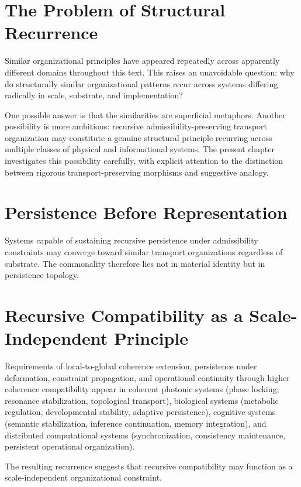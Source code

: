 \documentclass[11pt,openany]{book}
\theoremstyle{definition}
\theoremstyle{plain}
\begin{document}
\bigskip

\section{The Problem of Structural Recurrence}

Similar organizational principles have appeared repeatedly across apparently different domains throughout this text. This raises an unavoidable question: why do structurally similar organizational patterns recur across systems differing radically in scale, substrate, and implementation?

One possible answer is that the similarities are superficial metaphors. Another possibility is more ambitious: recursive admissibility-preserving transport organization may constitute a genuine structural principle recurring across multiple classes of physical and informational systems. The present chapter investigates this possibility carefully, with explicit attention to the distinction between rigorous transport-preserving morphisms and suggestive analogy.

\section{Persistence Before Representation}

Systems capable of sustaining recursive persistence under admissibility constraints may converge toward similar transport organizations regardless of substrate. The commonality therefore lies not in material identity but in persistence topology.

\section{Recursive Compatibility as a Scale-Independent Principle}

Requirements of local-to-global coherence extension, persistence under deformation, constraint propagation, and operational continuity through higher coherence compatibility appear in coherent photonic systems (phase locking, resonance stabilization, topological transport), biological systems (metabolic regulation, developmental stability, adaptive persistence), cognitive systems (semantic stabilization, inference continuation, memory integration), and distributed computational systems (synchronization, consistency maintenance, persistent operational organization).

The resulting recurrence suggests that recursive compatibility may function as a scale-independent organizational constraint.
\end{document}
